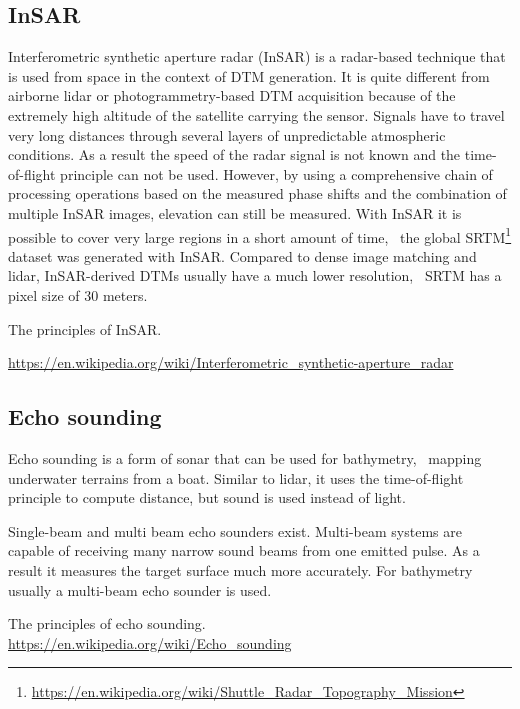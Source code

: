 \subsection{InSAR}
Interferometric synthetic aperture radar (InSAR) is a radar-based technique that is used from space in the context of DTM generation. 
It is quite different from airborne lidar or photo\-gramme\-try-based DTM acquisition because of the extremely high altitude of the satellite carrying the sensor. 
Signals have to travel very long distances through several layers of unpredictable atmospheric conditions. 
As a result the speed of the radar signal is not known and the time-of-flight principle can not be used. 
However, by using a comprehensive chain of processing operations based on the measured phase shifts and the combination of multiple InSAR images, elevation can still be measured. 
With InSAR it is possible to cover very large regions in a short amount of time, \eg\ the global SRTM\footnote{\url{https://en.wikipedia.org/wiki/Shuttle_Radar_Topography_Mission}} dataset was generated with InSAR\@. 
Compared to dense image matching and lidar, InSAR-derived DTMs usually have a much lower resolution, \eg\ SRTM has a pixel size of 30 meters.

\begin{link-box}
The principles of InSAR\@.

\url{https://en.wikipedia.org/wiki/Interferometric_synthetic-aperture_radar}
\end{link-box}

\subsection{Echo sounding}
\label{sec:mbes}
Echo sounding is a form of sonar that can be used for bathymetry, \ie\ mapping underwater terrains from a boat. 
Similar to lidar, it uses the time-of-flight principle to compute distance, but sound is used instead of light. 

Single-beam and multi beam echo sounders exist. Multi-beam systems are capable of receiving many narrow sound beams from one emitted pulse. As a result it measures the target surface much more accurately. 
For bathymetry usually a multi-beam echo sounder is used.

\begin{link-box}
  The principles of echo sounding.
  \\
  \url{https://en.wikipedia.org/wiki/Echo_sounding}
\end{link-box}




